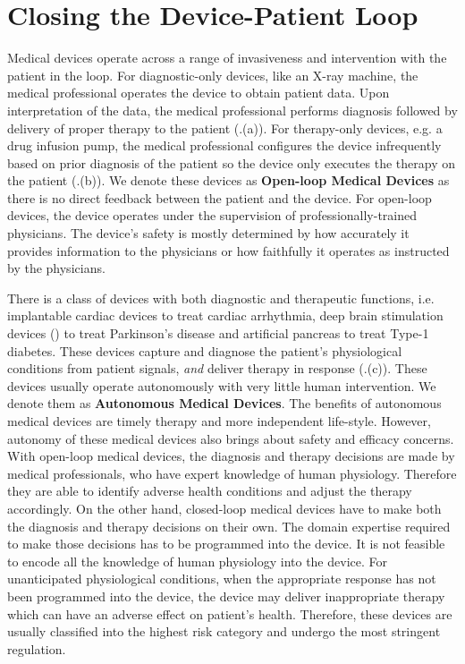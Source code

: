 \section{Closing the Device-Patient Loop}
Medical devices operate across a range of invasiveness and intervention with the patient in the loop. 
For diagnostic-only devices, like an X-ray machine, the medical professional operates the device to obtain patient data. 
Upon interpretation of the data, the medical professional performs diagnosis followed by delivery of proper therapy to the patient (.(a)). 
For therapy-only devices, e.g. a drug infusion pump, the medical professional configures the device infrequently based on prior diagnosis of the patient so the device only executes the therapy on the patient (.(b)). 
We denote these devices as \textbf{Open-loop Medical Devices} as there is no direct feedback between the patient and the device. 
For open-loop devices, the device operates under the supervision of professionally-trained physicians. 
The device's safety is mostly determined by how accurately it provides information to the physicians or how faithfully it operates as instructed by the physicians.

There is a class of devices with both diagnostic and therapeutic functions, i.e. implantable cardiac devices to treat cardiac arrhythmia, deep brain stimulation devices (\cite{Brain_sti}) to treat Parkinson's disease and artificial pancreas to treat Type-1 diabetes. 
These devices capture and diagnose the patient's physiological conditions from patient signals, \emph{and} deliver therapy in response (.(c)). These devices usually operate autonomously with very little human intervention. 
We denote them as \textbf{Autonomous Medical Devices}. 
The benefits of autonomous medical devices are timely therapy and more independent life-style.
However, autonomy of these medical devices also brings about safety and efficacy concerns. 
With open-loop medical devices, the diagnosis and therapy decisions are made by medical professionals, who have expert knowledge of human physiology. 
Therefore they are able to identify adverse health conditions and adjust the therapy accordingly. 
On the other hand, closed-loop medical devices have to make both the diagnosis and therapy decisions on their own. 
The domain expertise required to make those decisions has to be programmed into the device. 
It is not feasible to encode all the knowledge of human physiology into the device. 
For unanticipated physiological conditions, when the appropriate response has not been programmed into the device, the device may deliver inappropriate therapy which can have an adverse effect on patient's health. 
Therefore, these devices are usually classified into the highest risk category and undergo the most stringent regulation. 
